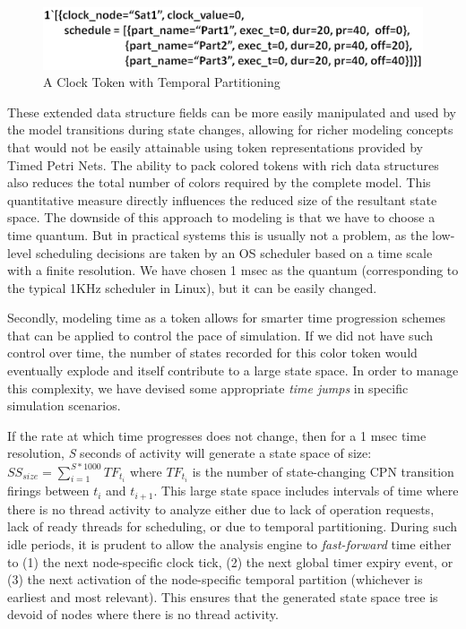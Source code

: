 \begin{figure}[h]
	\centering
	\includegraphics[width=\textwidth]{./img/clock}
	\caption{A Clock Token with Temporal Partitioning}
	\label{fig:clock}
\end{figure}

These extended data structure fields can be more easily manipulated and used by the model transitions during state changes, allowing for richer modeling concepts that would not be easily attainable using token representations provided by Timed Petri Nets. The ability to pack colored tokens with rich data structures also reduces the total number of colors required by the complete model. This quantitative measure directly influences the reduced size of the resultant state space. The downside of this approach to modeling is that we have to choose a time quantum. But in practical systems this is usually not a problem, as the low-level scheduling decisions are taken by an OS scheduler based on a time scale with a finite resolution. We have chosen 1 msec as the quantum (corresponding to the typical 1KHz scheduler in Linux), but it can be easily changed. 

Secondly, modeling time as a token allows for smarter time progression schemes that can be applied to control the pace of simulation. If we did not have such control over time, the number of states recorded for this color token would eventually explode and itself contribute to a large state space. In order to manage this complexity, we have devised some appropriate \emph{time jumps} in specific simulation scenarios. 

If the rate at which time progresses does not change, then for a 1 msec time resolution, \emph{S} seconds of activity will generate a state space of size: $SS_{size} = \sum\limits_{i=1}^{S*1000} TF_{t_i}$ where $TF_{t_i}$ is the number of state-changing CPN transition firings between $t_i$ and $t_{i+1}$. This large state space includes intervals of time where there is no thread activity to analyze either due to lack of operation requests, lack of ready threads for scheduling, or due to temporal partitioning. During such idle periods, it is prudent to allow the analysis engine to \emph{fast-forward} time either to (1) the next node-specific clock tick, (2) the next global timer expiry event, or (3) the next activation of the node-specific temporal partition (whichever is earliest and most relevant). This ensures that the generated state space tree is devoid of nodes where there is no thread activity.

